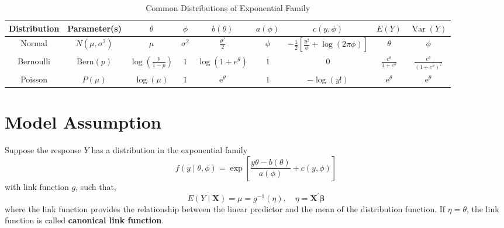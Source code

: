\begin{table}[hpt]
    \scriptsize
    \centering
    \caption{Common Distributions of Exponential Family}
    \begin{tabular}{ccccccccc}
        \toprule
        Distribution & Parameter(s)      & $\theta$                         & $\phi$       & $b(\theta)$                     & $a(\phi)$ & $c(y,\phi)$                                                   & $E(Y)$                            & $\operatorname{Var}(Y)$                                              \\
        \midrule
        Normal       & $N(\mu,\sigma^2)$ & $\mu$                            & $\sigma^{2}$ & $\frac{\theta^{2}}{2}$          & $\phi$    & $-\frac{1}{2}\left[\frac{y^{2}}{\phi}+\log (2\pi\phi)\right]$ & $\theta$                          & $\phi$                                                               \\
        Bernoulli    & $\text{Bern}(p)$  & $\log\left(\frac{p}{1-p}\right)$ & $1$          & $\log\left(1+e^{\theta}\right)$ & $1$       & $0$                                                           & $\frac{e^{\theta}}{1+e^{\theta}}$ & $\frac{e^{\theta}}{\left(1+e^{\theta}\right)^{2}}$ \\
        Poisson      & $P(\mu)$          & $\log(\mu)$                      & $1$          & $\mathrm{e}^{\theta}$           & $1$       & $-\log(y!)$                                                   & $\mathrm{e}^{\theta}$             & $\mathrm{e}^{\theta}$                                                \\
        \bottomrule
    \end{tabular}
\end{table}

\section{Model Assumption}

Suppose the response $Y$ has a distribution in the exponential family
\begin{equation*}
    f\left(y\mid\theta,\phi\right)=\exp\left[\frac{y\theta-b(\theta)}{a(\phi)}+c(y,\phi)\right]
\end{equation*}
with link function $g$, such that,
\begin{equation}
    E\left(Y\mid\mathbf{X}\right)=\mu=g^{-1}(\eta),\quad\eta=\mathbf{X}^{\prime}\boldsymbol{\beta}
\end{equation}
where the link function provides the relationship between the linear predictor and the mean of the distribution function. If $\eta=\theta$, the link function is called \textbf{canonical link function}.

